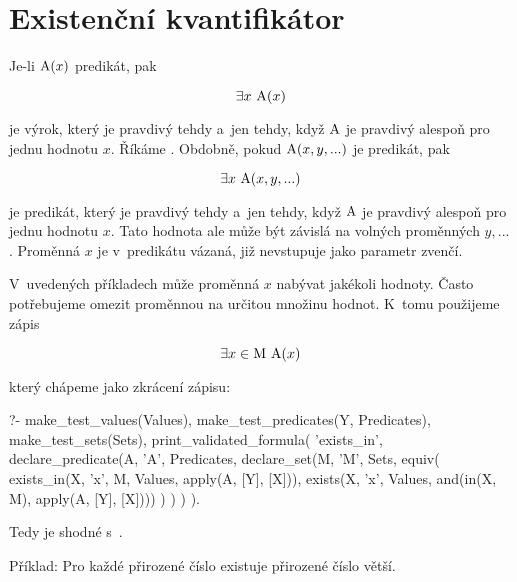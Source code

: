 \section{Existenční kvantifikátor}

Je-li \(\mathrm{A}(x)\) predikát, pak

\begin{equation}
\exists x \ \predicate{A}(x)
\end{equation}

je výrok, který je pravdivý tehdy a~jen tehdy, když \(\mathrm{A}\) je pravdivý alespoň pro jednu hodnotu \(x\). Říkáme . Obdobně, pokud \(\mathrm{A}(x, y, ...)\) je predikát, pak

\begin{equation}
\exists x \ \mathrm{A}(x, y, ...)
\end{equation}

je predikát, který je pravdivý tehdy a~jen tehdy, když \(\mathrm{A}\) je pravdivý alespoň pro jednu hodnotu \(x\). Tato hodnota ale může být závislá na volných proměnných \(y, ...\). Proměnná \(x\) je v~predikátu vázaná, již nevstupuje jako parametr zvenčí.

V~uvedených příkladech může proměnná \(x\) nabývat jakékoli hodnoty. Často potřebujeme omezit proměnnou na určitou množinu hodnot. K~tomu použijeme zápis

\begin{equation}
\exists x \in \mathrm{M} \ \predicate{A}(x)
\end{equation}

který chápeme jako zkrácení zápisu:

\begin{prolog}
?- 	make_test_values(Values),
	make_test_predicates(Y, Predicates),
	make_test_sets(Sets),
	print_validated_formula(
		'exists_in',
		declare_predicate(A, 'A', Predicates,
			declare_set(M, 'M', Sets,
				equiv(
					exists_in(X, 'x', M, Values, apply(A, [Y], [X])),
					exists(X, 'x', Values, and(in(X, M), apply(A, [Y], [X])))
				)
			)
		)
	).
\end{prolog}

Tedy  je shodné s~.

Příklad: Pro každé přirozené číslo existuje přirozené číslo větší. 


